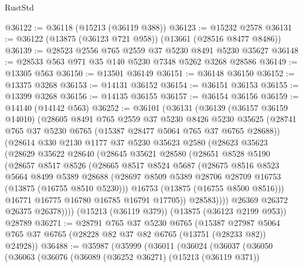 \begin{lexlean}{RustStd}
\begin{coremodule}
@36122 := @36118 (@15213 (@36119 @388))
@36123 := @15232 @2578
@36131 := @36122 (@13875 (@36123 @721 @958)) (@13661 (@28516 @8477 @8486))
@36139 := @28523 @2556 @765 @2559 @37 @5230 @8491 @5230 @35627
@36148 := @28533 @563 @971 @35 @140 @5230 @7348 @5262 @3268 @28586
@36149 := @13305 @563
@36150 := @13501 @36149
@36151 := @36148 @36150
@36152 := @13375 @3268
@36153 := @14131 @36152
@36154 := @36151 @36153
@36155 := @13399 @3268
@36156 := @14135 @36155
@36157 := @36154 @36156
@36159 := @14140 (@14142 @563)
@36252 := @36101
    (@36131
      (@36139
        (@36157 @36159 @14010)
        (@28605
          @8491
          @765
          @2559
          @37
          @5230
          @8426
          @5230
          @35625
          (@28741 @765 @37 @5230 @6765 (@15387 @28477 @5064 @765 @37 @6765 @28688))
          (@28614
            @330
            @2130
            @1177
            @37
            @5230
            @35623
            @2580
            (@28623
              @35623
              (@28629
                @35622
                @28640
                (@28645
                  @35621
                  @28580
                  (@28651
                    @8528
                    @5190
                    (@28657
                      @8517
                      @8526
                      (@28665
                        @8517
                        @8524
                        @5687
                        (@28675
                          @8516
                          @8523
                          @5664
                          @8499
                          @5389
                          @28688
                          (@28697 @8509 @5389 @28706 @28709 @16753 (@13875 (@16755 @8510 @5230)))
                          @16753
                          (@13875 (@16755 @8500 @8516)))
                        @16771
                        @16775
                        @16780
                        @16785
                        @16791
                        @17705))
                    @28583))))
            @26369
            @26372
            @26375
            @26378))))
    (@15213 (@36119 @379))
    (@13875 (@36123 @2199 @953))
    @28789
@36271 := @28791
    @765
    @37
    @5230
    @6765
    (@15387 @27987 @5064 @765 @37 @6765 (@28228 @82 @37 @82 @6765 (@13751 (@28233 @82)) @24928))
@36488 := @35987
    (@35999
      (@36011
        (@36024
          (@36037
            (@36050
              (@36063
                (@36076
                  (@36089
                    (@36252 @36271)
                    (@15213 (@36119 @371))

\end{coremodule}
\end{lexlean}
